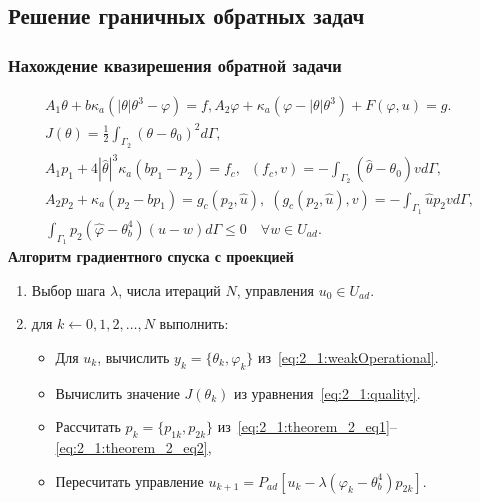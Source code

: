 \subsection{Решение граничных обратных задач}
\begin{frame}
    \frametitle{Нахождение квазирешения обратной задачи}
    \begin{gather}
        A_1 \theta + b \kappa_a (| \theta | \theta^3 - \varphi ) =
        f, A_2 \varphi + \kappa_a (\varphi - |\theta|\theta^3) + F(\varphi, u) = g.
        \label{eq:2_1:weakOperational}\\
        J(\theta) = \frac{1}{2} \int_{\Gamma_2} (\theta - \theta_0)^2 d\Gamma,
        \label{eq:2_1:quality}\\
        A_1 p_1 + 4 |\hat{\theta}|^3 \kappa_a(b p_1 - p_2) = f_c,
        \;\; (f_c,v) = - \int_{\Gamma_2} (\hat{\theta} - \theta_0) v d\Gamma,
        \label{eq:2_1:theorem_2_eq1}\\
        A_2 p_2 + \kappa_a (p_2-b p_1) = g_c(p_2, \hat{u}),
        \;(g_c(p_2, \hat{u}), v) = -\int_{\Gamma_1} \hat{u} p_2 v d\Gamma,
        \label{eq:2_1:theorem_2_eq2}\\
        \int_{\Gamma_1} p_2 (\hat{\varphi} - \theta_b^4)(u-w) d\Gamma
        \leq 0 \quad \forall w \in U_{ad}. \label{eq:2_1:theorem_2_eq3}
    \end{gather}
    \textbf{Алгоритм градиентного спуска с проекцией}
    \begin{enumerate}
        \item Выбор шага $\lambda$, числа итераций $N$, управления $u_0 \in U_{ad}$.
        \item для $k \leftarrow 0,1,2, \ldots, N$ выполнить:
        \begin{itemize}
            \item Для $u_{k}$, вычислить $y_k = \{\theta_k, \varphi_k\}$ из~\eqref{eq:2_1:weakOperational}.
            \item Вычислить значение $J(\theta_k)$ из уравнения~\eqref{eq:2_1:quality}.
            \item Рассчитать $p_k=\{p_{1k},p_{2k}\}$
            из~\eqref{eq:2_1:theorem_2_eq1}--\eqref{eq:2_1:theorem_2_eq2},
            \item Пересчитать управление
            $u_{k+1} = P_{ad}\left[ u_k - \lambda (\varphi_k - \theta_b^4)p_{2k} \right]$.
        \end{itemize}
    \end{enumerate}
\end{frame}

